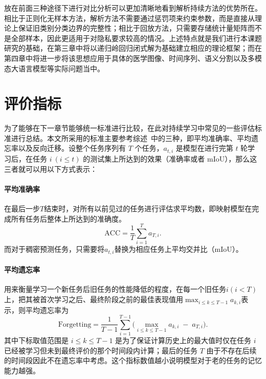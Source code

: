 放在前面三种途径下进行对比分析可以更加清晰地看到解析持续方法的优势所在。相比于正则化无样本方法，解析方法不需要通过惩罚项来约束参数，而是直接从理论上保证旧类别分类边界的完整性；相比于回放方法，只需要存储统计量矩阵而不是全部样本，因此更适用于对隐私要求较高的情况。上述特点就是我们进行本课题研究的基础，在第三章中将以递归岭回归闭式解为基础建立相应的理论框架；而在第四章中将进一步将该思想应用于具体的医学图像、时间序列、语义分割以及多模态大语言模型等实际问题当中。

\section{评价指标}

为了能够在下一章节能够统一标准进行比较，在此对持续学习中常见的一些评估标准进行总结。本文所采用的标准主要参考综述~\citep{wang2024survey, zhou2024class, zhou2023cil_survey_zh}中的三种，即平均准确率、平均遗忘率以及反向迁移。设整个任务序列有 $T$ 个任务，$a_{t,i}$ 是模型在进行完第 $t$ 轮学习后，在任务 $i\ (i \le t)$ 的测试集上所达到的效果（准确率或者 mIoU），那么这三者就可以用以下方式表示：

\paragraph{平均准确率} 在最后一步$T$结束时，对所有以前见过的任务进行评估求平均数，即映射模型在完成所有任务后整体上所达到的准确度。
\begin{equation}
\mathrm{ACC}=\frac{1}{T}\sum_{i=1}^{T}a_{T,i}.
\label{eq:metric_acc}
\end{equation}
而对于稠密预测任务，只需要将$ a_{t, i} $替换为相应任务上平均交并比（mIoU）。

\paragraph{平均遗忘率}用来衡量学习一个新任务后旧任务的性能降低的程度，在每一个旧任务$i (i<T)$上，把其被首次学习之后、最终阶段之前的最佳表现值用$\max_{i\leq k\leq T-1} a_{k,i}$表示，则平均遗忘率为
\begin{equation}
\mathrm{Forgetting}=\frac{1}{T-1}\sum_{i=1}^{T-1}\Big(\max_{i\le k\le T-1} a_{k,i} \;-\; a_{T,i}\Big).
\label{eq:metric_forget}
\end{equation}
其中下标取值范围是 $i \le k \le T-1$ 是为了保证计算历史上的最大值时仅在任务 $i$ 已经被学习但未到最终评价的那个时间段内计算；最后的任务 $T$ 由于不存在后续的时间段因此不在遗忘率中考虑。这个指标数值越小说明模型对于老的任务的记忆能力越强。

